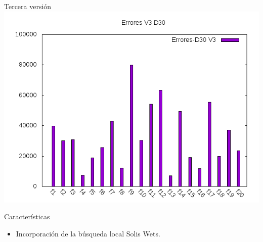 \documentclass[10pt]{beamer}
\begin{document}
\begin{frame}[fragile]{Tercera versión}
		\includegraphics[scale=0.25]{./Imagenes/Errores/errores_v3_d30.png}
		
		\begin{block}{Características}
			\begin{itemize}
				\item Incorporación de la búsqueda local Solis Wets.
			\end{itemize}
		\end{block}
	\end{frame}
\end{document}
